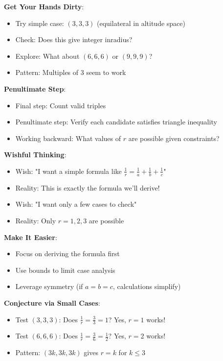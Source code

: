 \documentclass[12pt]{article}
\begin{document}
\begin{strategicbox}
\textbf{Get Your Hands Dirty}:
\begin{itemize}
    \item Try simple case: $(3, 3, 3)$ (equilateral in altitude space)
    \item Check: Does this give integer inradius?
    \item Explore: What about $(6, 6, 6)$ or $(9, 9, 9)$?
    \item Pattern: Multiples of 3 seem to work
\end{itemize}

\textbf{Penultimate Step}:
\begin{itemize}
    \item Final step: Count valid triples
    \item Penultimate step: Verify each candidate satisfies triangle inequality
    \item Working backward: What values of $r$ are possible given constraints?
\end{itemize}

\textbf{Wishful Thinking}:
\begin{itemize}
    \item Wish: "I want a simple formula like $\frac{1}{r} = \frac{1}{a} + \frac{1}{b} + \frac{1}{c}$"
    \item Reality: This is exactly the formula we'll derive!
    \item Wish: "I want only a few cases to check"
    \item Reality: Only $r = 1, 2, 3$ are possible
\end{itemize}

\textbf{Make It Easier}:
\begin{itemize}
    \item Focus on deriving the formula first
    \item Use bounds to limit case analysis
    \item Leverage symmetry (if $a = b = c$, calculations simplify)
\end{itemize}

\textbf{Conjecture via Small Cases}:
\begin{itemize}
    \item Test $(3, 3, 3)$: Does $\frac{1}{r} = \frac{3}{3} = 1$? Yes, $r = 1$ works!
    \item Test $(6, 6, 6)$: Does $\frac{1}{r} = \frac{3}{6} = \frac{1}{2}$? Yes, $r = 2$ works!
    \item Pattern: $(3k, 3k, 3k)$ gives $r = k$ for $k \leq 3$
\end{itemize}


\end{strategicbox}
\end{document}
